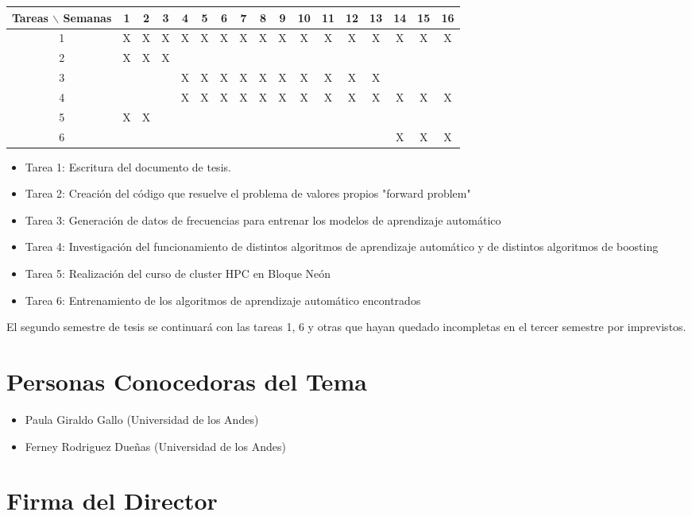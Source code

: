 \documentclass[12pt]{article}
\begin{document}
\begin{table}[H]
	\begin{tabular}{|c|cccccccccccccccc| }
	\hline
	Tareas $\backslash$ Semanas & 1 & 2 & 3 & 4 & 5 & 6 & 7 & 8 & 9 & 10 & 11 & 12 & 13 & 14 & 15 & 16  \\
	\hline
	1 & X & X & X & X & X & X & X & X & X & X & X & X & X & X & X & X \\
	2 & X & X & X &   &   &   &   &   &   &   &   &   &   &   &   &   \\
	3 &   &   &   & X & X & X & X & X & X & X & X & X & X &   &   &   \\
	4 &   &   &   & X & X & X & X & X & X & X & X & X & X & X & X & X \\
	5 & X & X &   &   &   &   &   &   &   &   &   &   &   &   &   &   \\
	6 &   &   &   &   &   &   &   &   &   &   &   &   &   & X & X & X \\
	\hline
	\end{tabular}
\end{table}
\vspace{1mm}

\begin{itemize}
	\item Tarea 1: Escritura del documento de tesis.
	\item Tarea 2: Creación del código que resuelve el problema de valores propios "forward problem"
	\item Tarea 3: Generación de datos de frecuencias para entrenar los modelos de aprendizaje automático
	\item Tarea 4: Investigación del funcionamiento de distintos algoritmos de aprendizaje automático y de distintos algoritmos de boosting
	\item Tarea 5: Realización del curso de cluster HPC en Bloque Neón
	\item Tarea 6: Entrenamiento de los algoritmos de aprendizaje automático encontrados
\end{itemize}

El segundo semestre de tesis se continuará con las tareas 1, 6 y otras que hayan quedado incompletas en el tercer semestre por imprevistos. 

\section{Personas Conocedoras del Tema}


\begin{itemize}
	\item Paula Giraldo Gallo (Universidad de los Andes)
	\item Ferney Rodriguez Dueñas (Universidad de los Andes)
\end{itemize}





\section*{Firma del Director}
\vspace{1.5cm}
\end{document}
